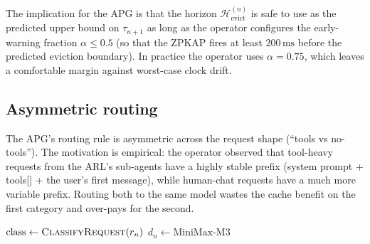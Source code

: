\noindent
The implication for the APG is that the horizon
$\mathcal{H}_{\text{evict}}^{(n)}$ is safe to use as the predicted
upper bound on $\tau_{n+1}$ as long as the operator configures the
early-warning fraction $\alpha \le 0.5$ (so that the ZPKAP fires
at least $200\,\mathrm{ms}$ before the predicted eviction
boundary). In practice the operator uses $\alpha = 0.75$, which
leaves a comfortable margin against worst-case clock drift.

\subsection{Asymmetric routing}
\label{app:apg:asym}

The APG's routing rule is asymmetric across the request shape
(``tools vs no-tools''). The motivation is empirical: the operator
observed that tool-heavy requests from the ARL's sub-agents have a
highly stable prefix (system prompt + tools[] + the user's first
message), while human-chat requests have a much more variable
prefix. Routing both to the same model wastes the cache benefit on
the first category and over-pays for the second.

\begin{algorithm}[ht]
\caption{Asymmetric backend selection.}
\label{alg:asym}
\SetAlgoLined
{}

\BlankLine
{}
\BlankLine
{}
$\mathrm{class} \leftarrow \textsc{ClassifyRequest}(r_n)$\;
\BlankLine
{}
\BlankLine
{}
$d_n \leftarrow \mathrm{MiniMax\text{-}M3}$\;
\;
\end{algorithm}

